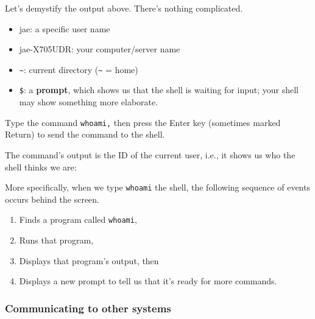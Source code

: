 \documentclass[
  letterpaper,
  DIV=11,
  numbers=noendperiod]{scrreprt}
\newenvironment{Shaded}{\begin{snugshade}}{\end{snugshade}}
\newcommand{\CommentTok}[1]{\textcolor[rgb]{0.37,0.37,0.37}{#1}}
\newcommand{\ExtensionTok}[1]{\textcolor[rgb]{0.00,0.23,0.31}{#1}}
\newcommand{\NormalTok}[1]{\textcolor[rgb]{0.00,0.23,0.31}{#1}}
\providecommand{\tightlist}{%
  \setlength{\itemsep}{0pt}\setlength{\parskip}{0pt}}\usepackage{longtable,booktabs,array}
\begin{document}
\begin{Shaded}
\end{Shaded}

Let's demystify the output above. There's nothing complicated.

\begin{itemize}
\tightlist
\item
  jae: a specific user name
\item
  jae-X705UDR: your computer/server name
\item
  \texttt{\textasciitilde{}}: current directory
  (\texttt{\textasciitilde{}} = home)
\item
  \texttt{\$}: a \textbf{prompt}, which shows us that the shell is
  waiting for input; your shell may show something more elaborate.
\end{itemize}

Type the command \texttt{whoami,} then press the Enter key (sometimes
marked Return) to send the command to the shell.

The command's output is the ID of the current user, i.e., it shows us
who the shell thinks we are:

\begin{Shaded}
\end{Shaded}

More specifically, when we type \texttt{whoami} the shell, the following
sequence of events occurs behind the screen.

\begin{enumerate}
\def\labelenumi{\arabic{enumi}.}
\tightlist
\item
  Finds a program called \texttt{whoami},
\item
  Runs that program,
\item
  Displays that program's output, then
\item
  Displays a new prompt to tell us that it's ready for more commands.
\end{enumerate}

\hypertarget{communicating-to-other-systems}{%
\subsubsection*{Communicating to other
systems}\label{communicating-to-other-systems}}
\end{document}
